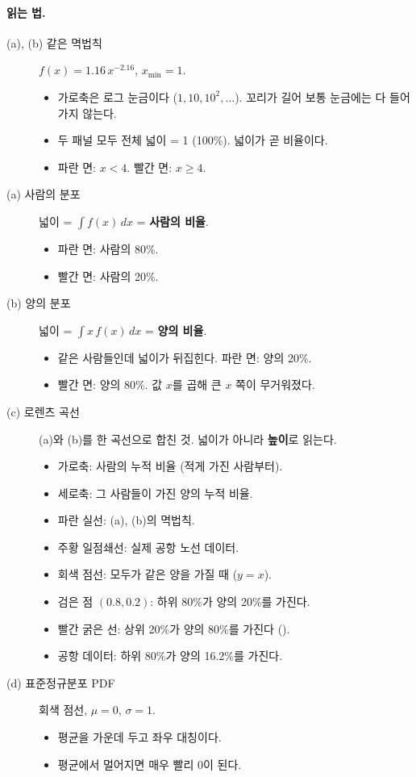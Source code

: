 \documentclass[11pt]{article}
\newcommand{\term}[1]{\textbf{#1}}
\begin{document}
\paragraph{ 읽는 법.}
\begin{description}
  \item[(a), (b) 같은 멱법칙] $f(x) = 1.16\,x^{-2.16}$, $x_{\min} = 1$.
    \begin{itemize}
      \item 가로축은 로그 눈금이다 ($1, 10, 10^2, \dots$). 꼬리가 길어 보통 눈금에는 다 들어가지 않는다.
      \item 두 패널 모두 전체 넓이 = 1 (100\%). 넓이가 곧 비율이다.
      \item 파란 면: $x < 4$. 빨간 면: $x \ge 4$.
    \end{itemize}
  \item[(a) 사람의 분포] 넓이 = $\int f(x)\,dx$ = \term{사람의 비율}.
    \begin{itemize}
      \item 파란 면: 사람의 80\%.
      \item 빨간 면: 사람의 20\%.
    \end{itemize}
  \item[(b) 양의 분포] 넓이 = $\int x\,f(x)\,dx$ = \term{양의 비율}.
    \begin{itemize}
      \item 같은 사람들인데 넓이가 뒤집힌다. 파란 면: 양의 20\%.
      \item 빨간 면: 양의 80\%. 값 $x$를 곱해 큰 $x$ 쪽이 무거워졌다.
    \end{itemize}
  \item[(c) 로렌츠 곡선] (a)와 (b)를 한 곡선으로 합친 것. 넓이가 아니라 \term{높이}로 읽는다.
    \begin{itemize}
      \item 가로축: 사람의 누적 비율 (적게 가진 사람부터).
      \item 세로축: 그 사람들이 가진 양의 누적 비율.
      \item 파란 실선: (a), (b)의 멱법칙.
      \item 주황 일점쇄선: 실제 공항 노선 데이터.
      \item 회색 점선: 모두가 같은 양을 가질 때 ($y = x$).
      \item 검은 점 $(0.8, 0.2)$: 하위 80\%가 양의 20\%를 가진다.
      \item 빨간 굵은 선: 상위 20\%가 양의 80\%를 가진다 ().
      \item 공항 데이터: 하위 80\%가 양의 16.2\%를 가진다.
    \end{itemize}
  \item[(d) 표준정규분포 PDF] 회색 점선, $\mu = 0$, $\sigma = 1$.
    \begin{itemize}
      \item 평균을 가운데 두고 좌우 대칭이다.
      \item 평균에서 멀어지면 매우 빨리 $0$이 된다.
    \end{itemize}
\end{description}
\end{document}
